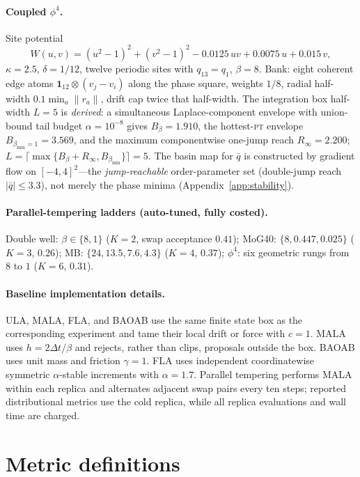 \documentclass[11pt]{article}
\newcommand{\one}{\mathbf{1}}
\begin{document}
\paragraph{Coupled $\phi^4$.}  Site potential
\begin{equation}
 W(u,v)=(u^2-1)^2+(v^2-1)^2-0.0125\,uv+0.0075\,u+0.015\,v ,
\end{equation}
$\kappa=2.5$, $\delta=1/12$, twelve periodic sites with $q_{13}=q_1$,
$\beta=8$.  Bank: eight
coherent edge atoms $\one_{12}\otimes(v_j-v_i)$ along the phase square,
weights $1/8$, radial half-width $0.1\min_a\lVert r_a\rVert$, drift cap twice
that half-width.  The integration box half-width $L=5$ is \emph{derived}: a
simultaneous Laplace-component envelope with union-bound tail budget
$\alpha=10^{-8}$ gives $B_\beta=1.910$, the hottest-\textsc{pt} envelope
$B_{\beta_{\min}=1}=3.569$, and the maximum componentwise one-jump reach
$R_\infty=2.200$; $L=\lceil\max\{B_\beta+R_\infty,B_{\beta_{\min}}\}\rceil=5$.
The basin map for $\bar q$ is constructed by gradient flow on
$[-4,4]^2$---the \emph{jump-reachable} order-parameter set (double-jump reach
$|\bar q|\le3.3$), not merely the phase minima (Appendix~\ref{app:stability}).

\paragraph{Parallel-tempering ladders (auto-tuned, fully costed).}
Double well: $\beta\in\{8,1\}$ ($K=2$, swap acceptance $0.41$); MoG40:
$\{8,0.447,0.025\}$ ($K=3$, $0.26$); MB: $\{24,13.5,7.6,4.3\}$ ($K=4$,
$0.37$); $\phi^4$: six geometric rungs from $8$ to $1$ ($K=6$, $0.31$).

\paragraph{Baseline implementation details.}
ULA, MALA, FLA, and BAOAB use the same finite state box as the corresponding
experiment and tame their local drift or force with $c=1$.  MALA uses
$h=2\Delta t/\beta$ and rejects, rather than clips, proposals outside the box.
BAOAB uses unit mass and friction $\gamma=1$.  FLA uses independent
coordinatewise symmetric $\alpha$-stable increments with $\alpha=1.7$.
Parallel tempering performs MALA within each replica and alternates adjacent
swap pairs every ten steps; reported distributional metrics use the cold
replica, while all replica evaluations and wall time are charged.

\section{Metric definitions}
\label{app:metrics}
\end{document}

